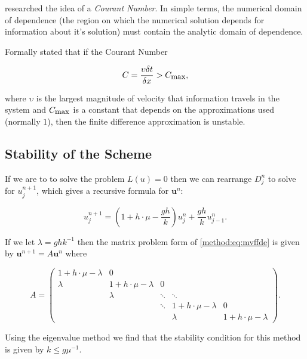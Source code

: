 \documentclass[../main.tex]{subfiles}
\begin{document}
  \cite{courant1928} researched the idea of a \emph{Courant Number}. In simple terms, the numerical domain of dependence (the region on which the numerical solution depends for information about it's solution) must contain the analytic domain of dependence.

  Formally \cite{courant1928} stated that if the Courant Number

  \begin{equation}
    C = \frac{\upsilon \delta t}{\delta x} > C_{\mbox{\small max}},
  \end{equation}

  where $\upsilon$ is the largest magnitude of velocity that information travels in the system and $C_{\mbox{\small max}}$ is a constant that depends on the approximations used (normally $1$), then the finite difference approximation is unstable.

  \subsection{Stability of the Scheme}
  If we are to to solve the problem $L(u) = 0$ then we can rearrange $D^n_j$ to solve for $u^{n+1}_j$, which gives a recursive formula for $\mathbf{u}^n$:

  \begin{equation} \label{method:eq:mvffde}
    u^{n+1}_j = \left(1 + h \cdot \mu - \frac{gh}{k} \right) u^n_j + \frac{gh}{k} u^n_{j-1}.
  \end{equation}

  If we let $\lambda = gh k^{-1}$ then the matrix problem form of \autoref{method:eq:mvffde} is given by $\mathbf{u}^{n+1} = A \mathbf{u}^n$ where

  \begin{equation}\label{method:eq:noboundary}
    A = \begin{pmatrix}
      1 + h \cdot \mu - \lambda & 0 & \\
      \lambda & 1 + h \cdot \mu - \lambda & 0 \\
        & \lambda & \ddots & \ddots & \\
        &   & \ddots & 1 + h \cdot \mu - \lambda & 0 \\
        &   &        & \lambda & 1 + h \cdot \mu - \lambda
    \end{pmatrix}.
  \end{equation}

  Using the eigenvalue method we find that the stability condition for this method is given by $k \leq g \mu^{-1}$.
\end{document}

